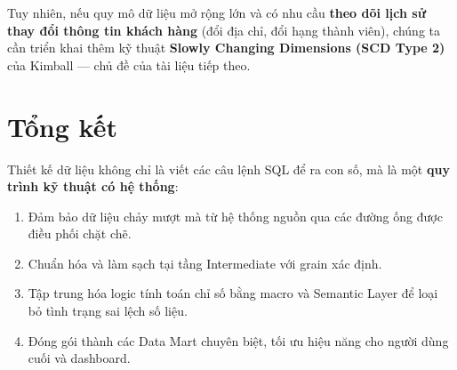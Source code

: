 \documentclass[12pt]{article}
\begin{document}
Tuy nhiên, nếu quy mô dữ liệu mở rộng lớn và có nhu cầu \textbf{theo dõi lịch sử thay đổi thông tin khách hàng} (đổi địa chỉ, đổi hạng thành viên), chúng ta cần triển khai thêm kỹ thuật \textbf{Slowly Changing Dimensions (SCD Type 2)} của Kimball --- chủ đề của tài liệu tiếp theo.

\section{Tổng kết}

Thiết kế dữ liệu không chỉ là viết các câu lệnh SQL để ra con số, mà là một \textbf{quy trình kỹ thuật có hệ thống}:
\begin{enumerate}
    \item Đảm bảo dữ liệu chảy mượt mà từ hệ thống nguồn qua các đường ống được điều phối chặt chẽ.
    \item Chuẩn hóa và làm sạch tại tầng Intermediate với grain xác định.
    \item Tập trung hóa logic tính toán chỉ số bằng macro và Semantic Layer để loại bỏ tình trạng sai lệch số liệu.
    \item Đóng gói thành các Data Mart chuyên biệt, tối ưu hiệu năng cho người dùng cuối và dashboard.
\end{enumerate}
\end{document}
